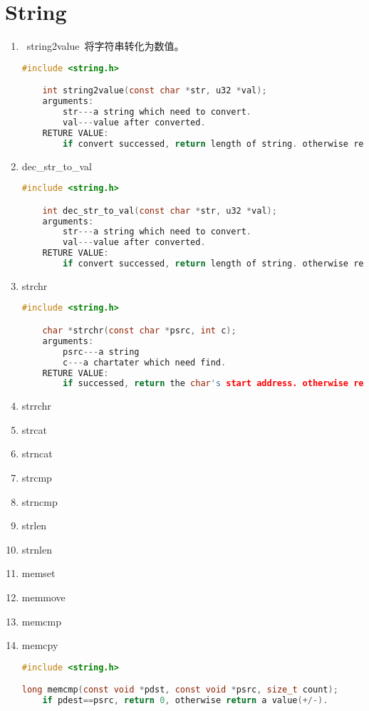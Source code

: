 \section{String}
\begin{enumerate}
\item ~string2value~将字符串转化为数值。
	\begin{lstlisting}[language=c, numbers=none]
	#include <string.h>

	int string2value(const char *str, u32 *val);
	arguments:
		str---a string which need to convert.
		val---value after converted.
	RETURE VALUE:
		if convert successed, return length of string. otherwise reture -EINVAL
	\end{lstlisting}
\item dec\_str\_to\_val
	\begin{lstlisting}[language=c, numbers=none]
	#include <string.h>

	int dec_str_to_val(const char *str, u32 *val);
	arguments:
		str---a string which need to convert.
		val---value after converted.
	RETURE VALUE:
		if convert successed, return length of string. otherwise reture -EINVAL
	\end{lstlisting}

\item strchr
	\begin{lstlisting}[language=c, numbers=none]
	#include <string.h>

	char *strchr(const char *psrc, int c);
	arguments:
		psrc---a string
		c---a chartater which need find.
	RETURE VALUE:
		if successed, return the char's start address. otherwise reture NULL.
	\end{lstlisting}

\item strrchr
\item strcat
\item strncat
\item strcmp
\item strncmp
\item strlen
\item strnlen
\item memset
\item memmove
\item memcmp
\item memcpy
	\begin{lstlisting}[language=c, numbers=none]
#include <string.h>

long memcmp(const void *pdst, const void *psrc, size_t count);
	if pdest==psrc, return 0, otherwise return a value(+/-).
	\end{lstlisting}
\end{enumerate}

